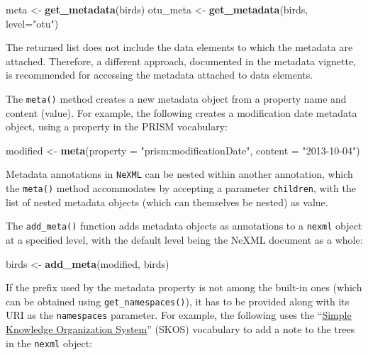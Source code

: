 \documentclass[author-year, review, 11pt]{components/elsarticle} %
\newenvironment{Shaded}{\begin{snugshade}}{\end{snugshade}}
\newcommand{\KeywordTok}[1]{\textcolor[rgb]{0.13,0.29,0.53}{\textbf{{#1}}}}
\newcommand{\DataTypeTok}[1]{\textcolor[rgb]{0.13,0.29,0.53}{{#1}}}
\newcommand{\StringTok}[1]{\textcolor[rgb]{0.31,0.60,0.02}{{#1}}}
\newcommand{\NormalTok}[1]{{#1}}
\begin{document}
\begin{Shaded}
\begin{Highlighting}[]
\NormalTok{meta <-}\StringTok{ }\KeywordTok{get_metadata}\NormalTok{(birds) }
\NormalTok{otu_meta <-}\StringTok{ }\KeywordTok{get_metadata}\NormalTok{(birds, }\DataTypeTok{level=}\StringTok{"otu"}\NormalTok{)}
\end{Highlighting}
\end{Shaded}

The returned list does not include the data elements to which the
metadata are attached. Therefore, a different approach, documented in
the metadata vignette, is recommended for accessing the metadata
attached to data elements.

The \texttt{meta()} method creates a new metadata object from a property
name and content (value). For example, the following creates a
modification date metadata object, using a property in the PRISM
vocabulary:

\begin{Shaded}
\begin{Highlighting}[]
\NormalTok{modified <-}\StringTok{ }\KeywordTok{meta}\NormalTok{(}\DataTypeTok{property =} \StringTok{"prism:modificationDate"}\NormalTok{, }\DataTypeTok{content =} \StringTok{"2013-10-04"}\NormalTok{)}
\end{Highlighting}
\end{Shaded}

Metadata annotations in \texttt{NeXML} can be nested within another
annotation, which the \texttt{meta()} method accommodates by accepting a
parameter \texttt{children}, with the list of nested metadata objects
(which can themselves be nested) as value.

The \texttt{add\_meta()} function adds metadata objects as annotations
to a \texttt{nexml} object at a specified level, with the default level
being the NeXML document as a whole:

\begin{Shaded}
\begin{Highlighting}[]
\NormalTok{birds <-}\StringTok{ }\KeywordTok{add_meta}\NormalTok{(modified, birds) }
\end{Highlighting}
\end{Shaded}

If the prefix used by the metadata property is not among the built-in
ones (which can be obtained using \texttt{get\_namespaces()}), it has to
be provided along with its URI as the \texttt{namespaces} parameter. For
example, the following uses the
``\href{http://www.w3.org/TR/skos-reference/}{Simple Knowledge
Organization System}'' (SKOS) vocabulary to add a note to the trees in
the \texttt{nexml} object:
\end{document}

